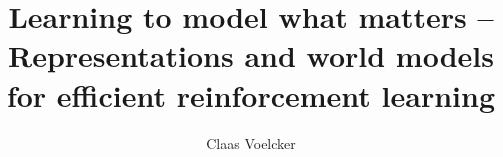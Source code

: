 \documentclass[11pt]{ut-thesis}
\author{Claas Voelcker}
\title{Learning to model what matters -- Representations and world models for efficient reinforcement learning}
\begin{document}
  \frontmatter
    \maketitle
    \begin{abstract}
      
    \end{abstract}
    \begin{dedication}
    \end{dedication}
    \begin{acknowledgements}
    \end{acknowledgements}
    \tableofcontents
  \mainmatter
    
    
    
    
    
    
    
    
    
  \appendix
    
    
  \backmatter
  \printbibliography[heading=bibintoc]
  \lipsum[1-6]
\end{document}
